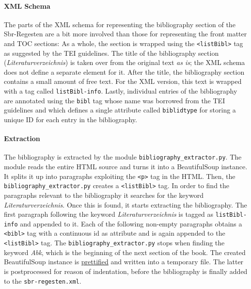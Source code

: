 \paragraph{XML Schema}

The parts of the XML schema for representing the bibliography section
of the Sbr-Regesten are a bit more involved than those for
representing the front matter and TOC sections: As a whole, the
section is wrapped using the \texttt{<listBibl>} tag as suggested by
the TEI guidelines. The title of the bibliography section
(\emph{Literaturverzeichnis}) is taken over from the original text
\emph{as is}; the XML schema does not define a separate element for
it. After the title, the bibliography section contains a small amount
of free text. For the XML version, this text is wrapped with a tag
called \texttt{listBibl-info}. Lastly, individual entries of the
bibliography are annotated using the \texttt{bibl} tag whose name was
borrowed from the TEI guidelines and which defines a single attribute
called \texttt{biblidtype} for storing a unique ID for each entry in
the bibliography.

\paragraph{Extraction}

The bibliography is extracted by the module
\texttt{bibliography\_extractor.py}. The module reads the entire HTML
source and turns it into a BeautifulSoup instance. It splits it up
into paragraphs exploiting the \texttt{<p>} tag in the HTML. Then, the
\texttt{bibliography\_extractor.py} creates a \texttt{<listBibl>} tag.
In order to find the paragraphs relevant to the bibliography it
searches for the keyword \emph{Literaturverzeichnis}. Once this is
found, it starts extracting the bibliography. The first paragraph
following the keyword \emph{Literaturverzeichnis} is tagged as
\texttt{listBibl-info} and appended to it. Each of the following
non-empty paragraphs obtains a \texttt{<bibl>} tag with a continuous
id as attribute and is again appended to the \texttt{<listBibl>} tag.
The \texttt{bibliography\_extractor.py} stops when finding the keyword
\emph{Abk}, which is the beginning of the next section of the book.
The created BeautifulSoup instance is
\href{http://www.crummy.com/software/BeautifulSoup/bs4/doc/#pretty-printing}{prettified}
and written into a temporary file. The latter is postprocessed for
reason of indentation, before the bibliography is finally added to the
\texttt{sbr-regesten.xml}.

